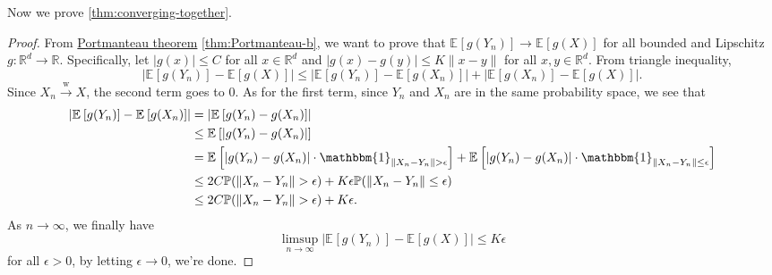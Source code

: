 Now we prove \autoref{thm:converging-together}.

\begin{proof}
	From \hyperref[thm:Portmanteau]{Portmanteau theorem} \autoref{thm:Portmanteau-b}, we want to prove that \(\mathbb{E}_{}\left[g(Y_n) \right] \to \mathbb{E}_{}\left[g(X) \right]\) for all bounded and Lipschitz \(g \colon \mathbb{R} ^d \to \mathbb{R} \). Specifically, let \(\vert g(x) \vert \leq C\) for all \(x \in\mathbb{R} ^d\) and \(\vert g(x) - g(y) \vert \leq K \lVert x - y \rVert \) for all \(x, y \in \mathbb{R} ^d\). From triangle inequality,
	\[
		\left\vert \mathbb{E}_{}\left[g(Y_n) \right] - \mathbb{E}_{}\left[g(X) \right]  \right\vert
		\leq \left\vert \mathbb{E}_{}\left[g(Y_n) \right] - \mathbb{E}_{}\left[g(X_n) \right]  \right\vert + \left\vert \mathbb{E}_{}\left[g(X_n) \right] - \mathbb{E}_{}\left[g(X) \right]  \right\vert .
	\]
	Since \(X_n \overset{\text{w} }{\to } X\), the second term goes to \(0\). As for the first term, since \(Y_n\) and \(X_n\) are in the same probability space, we see that
	\[
		\begin{split}
			\left\vert \mathbb{E}_{}\left[g(Y_n) \right] - \mathbb{E}_{}\left[g(X_n) \right]  \right\vert
			 & = \left\vert \mathbb{E}_{}\left[g(Y_n) - g(X_n) \right]  \right\vert                                                                                                                                                                 \\
			 & \leq \mathbb{E}_{}\left[ \vert g(Y_n) - g(X_n) \vert \right]                                                                                                                                                                         \\
			 & = \mathbb{E}_{}\left[\vert g(Y_n) - g(X_n) \vert \cdot \mathbbm{1}_{\lVert X_n - Y_n \rVert > \epsilon } \right] + \mathbb{E}_{}\left[\vert g(Y_n) - g(X_n) \vert \cdot \mathbbm{1}_{\lVert X_n - Y_n \rVert \leq \epsilon } \right] \\
			 & \leq 2C \mathbb{P} (\lVert X_n - Y_n \rVert > \epsilon ) + K \epsilon \mathbb{P} (\lVert X_n - Y_n \rVert \leq \epsilon )                                                                                                            \\
			 & \leq 2C \mathbb{P} (\lVert X_n - Y_n \rVert > \epsilon ) + K \epsilon .
		\end{split}
	\]
	As \(n \to \infty \), we finally have
	\[
		\limsup_{n \to \infty} \left\vert \mathbb{E}_{}\left[g(Y_n) \right] - \mathbb{E}_{}\left[g(X) \right]  \right\vert
		\leq K \epsilon
	\]
	for all \(\epsilon > 0\), by letting \(\epsilon \to 0\), we're done.
\end{proof}

